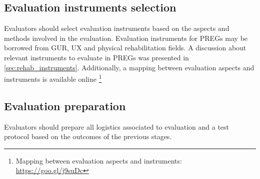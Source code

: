 \begin{table}[htb]
\caption{Evaluation methods for the game system layer over time}
\label{tab:methodsModelMappingGame}
\myfloatalign
{}
\end{table}

\subsection{Evaluation instruments selection}
Evaluators should select evaluation instruments based on the aspects and methods involved in the evaluation. Evaluation instruments for \acp{PREG} may be borrowed from \ac{GUR}, \ac{UX} and physical rehabilitation fields. A discussion about relevant instruments to evaluate in \acp{PREG} was presented in \autoref{sec:rehab_instruments}. Additionally, a mapping between evaluation aspects and instruments is available online \footnote{Mapping between evaluation aspects and instruments: \url{https://goo.gl/j9suDc}}

\subsection{Evaluation preparation}
Evaluators should prepare all logistics associated to evaluation and a test protocol based on the outcomes of the previous stages.

